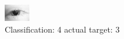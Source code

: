 \begin{figure}[h!]
\begin{center}
\includegraphics[width=0.60\columnwidth]{figures/ID66_class_4_target_3.png}
\end{center}
\caption{ Classification: 4 actual target: 3}
\label{fig:ID66_class_4_target_3}
\end{figure}

